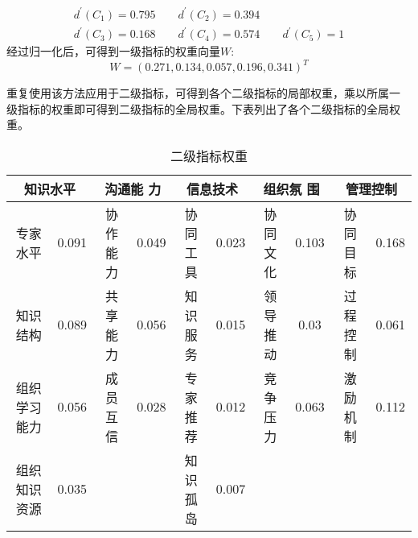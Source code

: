 \documentclass[adobefonts,UTF8]{ctexart}
\begin{document}
\begin{eqnarray*}
  d^{'}(C_1)=0.795 \qquad
  d^{'}(C_2)=0.394\\
  d^{'}(C_3)=0.168\qquad
  d^{'}(C_4)=0.574\qquad
  d^{'}(C_5)=1
\end{eqnarray*}
经过归一化后，可得到一级指标的权重向量$W$:
\[
W=(0.271,0.134,0.057,0.196,0.341)^T
\]

重复使用该方法应用于二级指标，可得到各个二级指标的局部权重，乘以所属一
级指标的权重即可得到二级指标的全局权重。下表列出了各个二级指标的全局权
重。
\begin{table}[htb]
  \centering
\caption{二级指标权重}
  \small
  \begin{tabular}{cccccccccc}
    \multicolumn{2}{c}{知识水平}&\multicolumn{2}{c}{沟通能
      力}&\multicolumn{2}{c}{信息技术}&\multicolumn{2}{c}{组织氛
      围}&\multicolumn{2}{c}{管理控制}\\\hline
    专家水平&0.091&协作能力&0.049&协同工具&0.023&协同文化&0.103&协同目
    标&0.168\\
    知识结构&0.089&共享能力&0.056&知识服务&0.015&领导推动&0.03&过程控
    制&0.061\\
    组织学习能力&0.056&成员互信&0.028&专家推荐&0.012&竞争压力&0.063&激
    励机制&0.112\\
    组织知识资源&0.035&&&知识孤岛&0.007&&&& \\
  \end{tabular}
  
\end{table}
\end{document}
